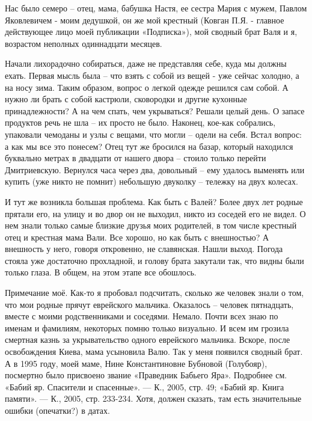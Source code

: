 Нас было семеро – отец, мама, бабушка Настя, ее сестра Мария с мужем, Павлом
Яковлевичем - моим дедушкой, он же мой крестный (Ковган П.Я. - главное
действующее лицо моей публикации «Подписка»), мой сводный брат Валя и я,
возрастом неполных одиннадцати месяцев.

Начали лихорадочно собираться, даже не представляя себе, куда мы должны ехать.
Первая мысль была – что взять с собой из вещей - уже сейчас холодно, а на носу
зима. Таким образом, вопрос о легкой одежде решился сам собой. А нужно ли брать
с собой кастрюли, сковородки и другие кухонные принадлежности? А на чем спать,
чем укрываться? Решали целый день. О запасе продуктов речь не шла – их просто
не было. Наконец, кое-как собрались, упаковали чемоданы и узлы с вещами, что
могли – одели на себя. Встал вопрос: а как мы все это понесем? Отец тут же
бросился на базар, который находился буквально метрах в двадцати от нашего
двора – стоило только перейти Дмитриевскую. Вернулся часа через два, довольный
– ему удалось выменять или купить (уже никто не помнит) небольшую двуколку –
тележку на двух колесах.

И тут же возникла большая проблема. Как быть с Валей? Более двух лет родные
прятали его, на улицу и во двор он не выходил, никто из соседей его не видел. О
нем знали только самые близкие друзья моих родителей, в том числе крестный отец
и крестная мама Вали. Все хорошо, но как быть с внешностью? А внешность у него,
говоря откровенно, не славянская. Нашли выход. Погода стояла уже достаточно
прохладной, и голову брата закутали так, что видны были только глаза. В общем,
на этом этапе все обошлось. 

Примечание моё. Как-то я пробовал подсчитать, сколько же человек знали о том,
что мои родные прячут еврейского мальчика. Оказалось – человек пятнадцать,
вместе с моими родственниками и соседями. Немало. Почти всех знаю по именам и
фамилиям, некоторых помню только визуально. И всем им грозила смертная казнь за
укрывательство одного еврейского мальчика. Вскоре, после освобождения Киева,
мама усыновила Валю. Так у меня появился сводный брат. А в 1995 году, моей
маме, Нине Константиновне Бубновой (Голубояр), посмертно было присвоено звание
«Праведник Бабьего Яра». Подробнее см. «Бабий яр. Спасители и спасенные». — К.,
2005, стр. 49; «Бабий яр. Книга памяти». — К., 2005, стр. 233-234. Хотя, должен
сказать, там есть значительные ошибки (опечатки?) в датах.

